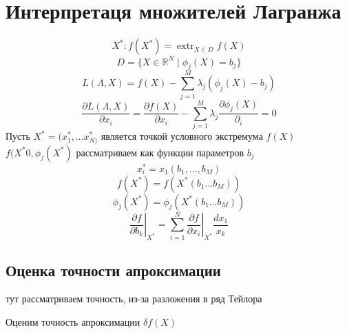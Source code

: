 \documentclass[14pt]{extarticle}
\DeclareMathOperator{\extr}{extr}
\newcommand{\bm}[1]{ \left.#1\right|}
\begin{document}
\section{Интерпретаця множителей Лагранжа}
\begin{equation}
X^{*} : f(X^{*})  = \extr_{X \in D} f(X)
\end{equation} 
\begin{equation}
	D = \{X \in \mathbb{R}^{N} \mid \phi_{j}(X)  = b_{j}\}
\end{equation} 
\begin{equation}
L(\Lambda,X) = f(X) - \sum_{j = 1}^{M} \lambda_{j} (\phi_{j} (X) - b_{j})
\end{equation} 
\begin{equation}
\frac{\partial L(\Lambda,X)}{\partial x_{i}} =
\frac{\partial f(X)}{\partial x_{i}} - \sum_{j=1}^{M} \lambda_{j} \frac{\partial \phi_{j}(X)}{\partial _{i} } = 0
\end{equation} 
Пусть $X^{*}=  (x_1^{*},\dots x^{*}_{N)}$ 
является точкой условного экстремума $f(X)$
 $f(X^{*}0,\phi_{j}(X^{*})$ рассматриваем как функции
 параметров $b_{j}$
  \begin{equation}
  x_{i}^{*} = x_1(b_1,\dots,b_{M})
  \end{equation} 
  \begin{equation}
  f(X^{*}) = f(X^{*}(b_1 \dots b_{M}))
  \end{equation} 
  \begin{equation}
  \phi_{j}(X^{*}) = \phi_{j}(X^{*}(b_1 \dots b_{M}))
  \end{equation} 
  \begin{equation}
  \bm{ \frac{\partial f}{\partial b_{k}} }_{X^{*}} = 
  \sum_{i = 1}^{N} \bm{ \frac{\partial f}{\partial x_{i}} }_{X^{*}} \frac{d x_1}{x_{k}}
  \end{equation} 

  \subsection{Оценка точности апроксимации}
  тут рассматриваем точность, из-за разложения в ряд Тейлора

  Оценим точность апроксимации $\delta f(X)$
\end{document}
